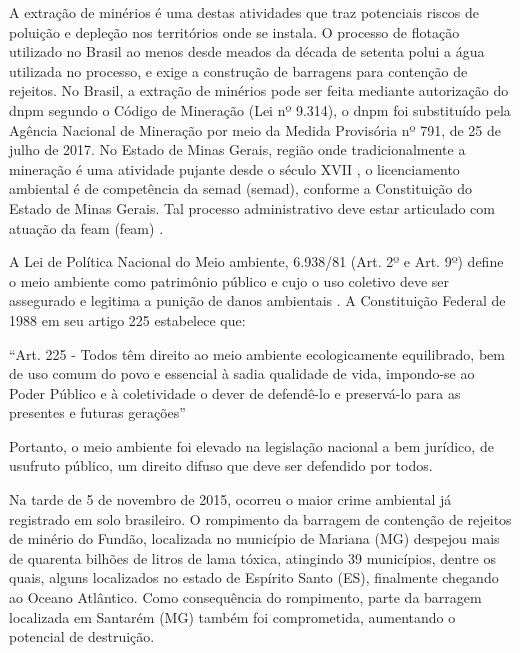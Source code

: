 \documentclass[
article,			%
11pt,				%
oneside,			%
a4paper,			%
english,			%
brazil,				%
sumario=tradicional
]{abntex2}
\begin{document}
	A extração de minérios é uma destas atividades que traz potenciais riscos de poluição e depleção nos territórios onde se instala. O processo de flotação utilizado no Brasil ao menos desde meados da década de setenta polui a água utilizada no processo, e exige a construção de barragens para contenção de rejeitos. No Brasil, a extração  de minérios pode ser feita mediante autorização do \glsdesc{dnpm} segundo o Código de Mineração (Lei nº 9.314), o \gls{dnpm} foi substituído pela Agência Nacional de Mineração por meio da Medida Provisória nº 791, de 25 de julho de 2017.  No Estado de Minas Gerais, região onde tradicionalmente a mineração é uma atividade pujante desde o século XVII , o licenciamento ambiental é de competência da \glsdesc{semad} (\gls{semad}), conforme a Constituição do Estado de Minas Gerais. Tal processo administrativo deve estar articulado com atuação  da \glsdesc{feam} (\gls{feam}) \cite{brasil1989a}.
	
	A Lei de Política Nacional do Meio ambiente, 6.938/81 (Art. 2º e Art. 9º) define o meio ambiente como patrimônio público e cujo o uso coletivo deve ser assegurado e legitima a punição de danos ambientais \cite{brasil1981a}. A Constituição Federal de 1988 em seu artigo 225 estabelece que:
	
	\begin{citacao}
		``Art. 225 - Todos têm direito ao meio ambiente ecologicamente equilibrado, bem de uso comum do povo e essencial à sadia qualidade de vida, impondo-se ao Poder Público e à coletividade o dever de defendê-lo e preservá-lo para as presentes e futuras gerações'' \cite{brasil1988a}
	\end{citacao}
	
	Portanto, o meio ambiente foi elevado na legislação nacional a bem jurídico,  de usufruto público, um direito difuso que deve ser defendido por todos. 
	 
	Na tarde de 5 de novembro de 2015, ocorreu o maior crime ambiental já registrado em solo brasileiro. O rompimento da barragem  de contenção de rejeitos de minério do Fundão, localizada no município de Mariana (MG) despejou mais de quarenta bilhões de litros de lama tóxica,  atingindo 39 municípios, dentre os quais, alguns localizados no estado de Espírito Santo (ES), finalmente chegando ao Oceano Atlântico. Como consequência do rompimento, parte da barragem localizada em Santarém (MG) também foi comprometida, aumentando o potencial de destruição.
	
\end{document}
